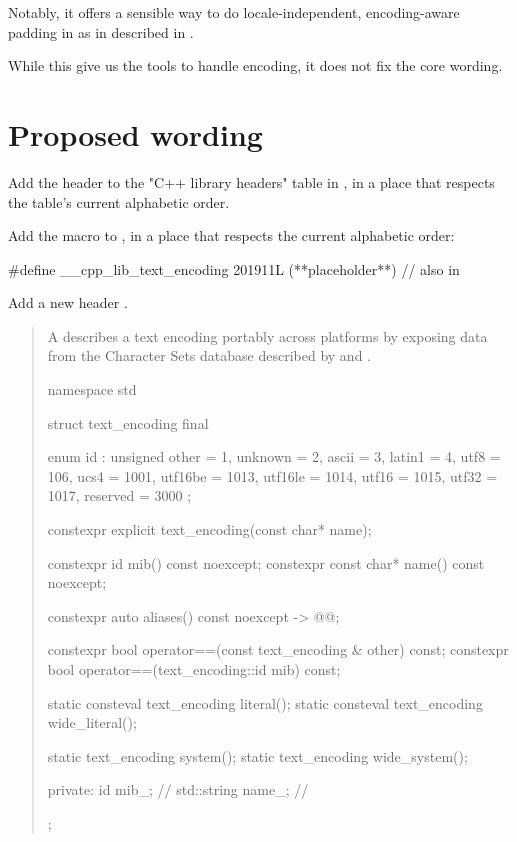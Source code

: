 \documentclass{wg21}
\begin{document}
Notably, it offers a sensible way to do locale-independent, encoding-aware padding in  as in described in \cite{P1868}.

While this give us the tools to handle encoding, it does not fix the core wording.

\newpage


\section{Proposed wording}

Add the header  to the "C++ library headers" table in
\tcode{[headers]}, in a place that respects the table’s current alphabetic
order.

Add the macro  to , in a
place that respects the current alphabetic order:

\begin{codeblock}
#define __cpp_lib_text_encoding 201911L (**placeholder**) // also in 
\end{codeblock}

Add a new header .

\begin{quote}
\begin{addedblock}
    
A  describes a text encoding portably across platforms by exposing data from the Character Sets database described by \cite{rfc2978} and \cite{rfc3808}.
    
\begin{codeblock}
    
namespace std {

struct text_encoding final{    
    enum id : unsigned {
        other = 1,
        unknown = 2,
        ascii = 3,
        latin1 = 4,
        utf8 = 106,
        ucs4 = 1001,
        utf16be = 1013,
        utf16le = 1014,
        utf16 = 1015,
        utf32 = 1017,
        reserved = 3000
    };
    
    constexpr explicit text_encoding(const char* name);
    
    constexpr id mib() const noexcept;
    constexpr const char* name() const noexcept;
    
    constexpr auto aliases() const noexcept -> @{\seebelow}@;
    
    constexpr bool operator==(const text_encoding & other) const;
    constexpr bool operator==(text_encoding::id mib) const;
    
    static consteval text_encoding literal();
    static consteval text_encoding wide_literal();
    
    static text_encoding system();
    static text_encoding wide_system();

    private:
        id mib_; // \expos
        std::string name_; // \expos
    };
}
    
\end{codeblock}
\end{addedblock}
\end{quote}
\end{document}
